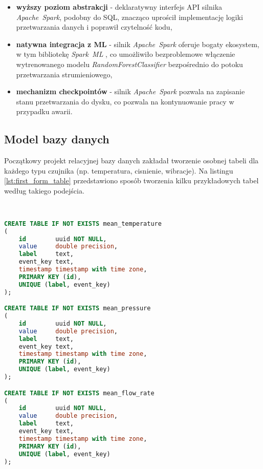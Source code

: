\begin{itemize}
    \item \textbf{wyższy poziom abstrakcji} - deklaratywny interfejs API silnika \mbox{\textit{Apache Spark}}, podobny do SQL, znacząco uprościł implementację logiki przetwarzania danych i poprawił czytelność kodu,
    \item \textbf{natywna integracja z ML} - silnik \mbox{\textit{Apache Spark}} oferuje bogaty ekosystem, w tym bibliotekę \mbox{\textit{Spark ML}} \cite{spark_streaming}, co umożliwiło bezproblemowe włączenie wytrenowanego modelu \textit{RandomForestClassifier} bezpośrednio do potoku przetwarzania strumieniowego,
    \item \textbf{mechanizm checkpointów} - silnik \mbox{\textit{Apache Spark}} pozwala na zapisanie stanu przetwarzania do dysku, co pozwala na kontynuowanie pracy w przypadku awarii.
\end{itemize}

\subsection{Model bazy danych}

Początkowy projekt relacyjnej bazy danych zakładał tworzenie osobnej tabeli dla każdego typu czujnika (np. temperatura, cisnienie, wibracje). Na listingu \ref{lst:first_form_table} przedstawiono sposób tworzenia kilku przykładowych tabel według takiego podejścia.

\begin{lstlisting}[caption=Pierwsza forma tabeli w relacyjnej bazie danych, label={lst:first_form_table},language=SQL]


CREATE TABLE IF NOT EXISTS mean_temperature
(
    id        uuid NOT NULL,
    value     double precision,
    label     text,
    event_key text,
    timestamp timestamp with time zone,
    PRIMARY KEY (id),
    UNIQUE (label, event_key)
);

CREATE TABLE IF NOT EXISTS mean_pressure
(
    id        uuid NOT NULL,
    value     double precision,
    label     text,
    event_key text,
    timestamp timestamp with time zone,
    PRIMARY KEY (id),
    UNIQUE (label, event_key)
);

CREATE TABLE IF NOT EXISTS mean_flow_rate
(
    id        uuid NOT NULL,
    value     double precision,
    label     text,
    event_key text,
    timestamp timestamp with time zone,
    PRIMARY KEY (id),
    UNIQUE (label, event_key)
);

\end{lstlisting}

